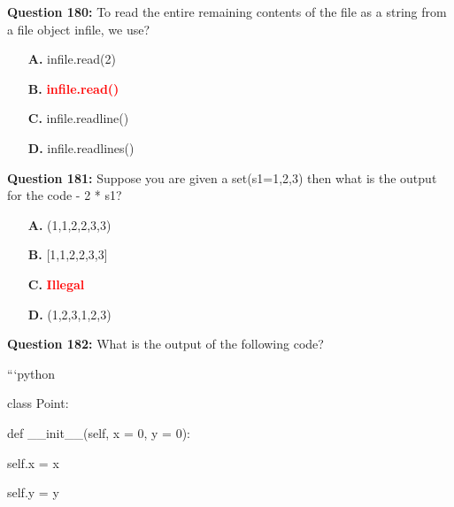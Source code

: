 \documentclass[12pt,a4paper]{article}
\begin{document}
\vspace{0.5cm}

\textbf{Question 180:} To read the entire remaining contents of the file as a string from a file object infile, we use?

\begin{itemize}
    \item[\textbf{A.}] infile.read(2)
    \item[\textbf{B.}] \textcolor{red}{\textbf{infile.read()}}
    \item[\textbf{C.}] infile.readline()
    \item[\textbf{D.}] infile.readlines()
\end{itemize}

\vspace{0.5cm}

\textbf{Question 181:} Suppose you are given a set(s1=1,2,3) then what is the output for the code - 2 * s1?

\begin{itemize}
    \item[\textbf{A.}] (1,1,2,2,3,3)
    \item[\textbf{B.}] [1,1,2,2,3,3]
    \item[\textbf{C.}] \textcolor{red}{\textbf{Illegal}}
    \item[\textbf{D.}] (1,2,3,1,2,3)
\end{itemize}

\vspace{0.5cm}

\textbf{Question 182:} What is the output of the following code?\newline

\newline
\newline

\newline
```python\newline

\newline
class Point:\newline

\newline
    def __init__(self, x = 0, y = 0):\newline

\newline
        self.x = x\newline

\newline
        self.y = y\newline
\end{document}
